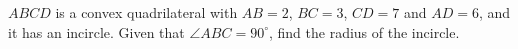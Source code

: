 $ABCD$ is a convex quadrilateral with $AB=2$, $BC=3$, $CD=7$ and $AD=6$, and it has an incircle. Given that $\angle ABC=90^\circ$, find the radius of the incircle.
